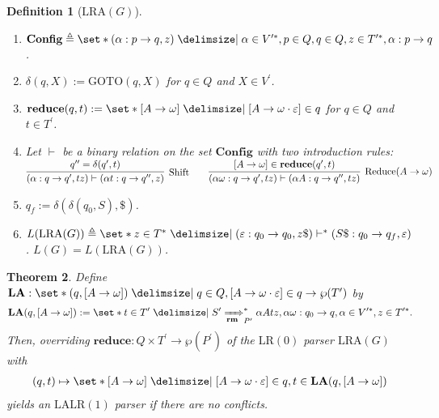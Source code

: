 \documentclass[12pt]{article}
\newtheorem{theorem}{Theorem}
\newtheorem{definition}[theorem]{Definition}
\newcommand{\powerset}
{ \wp }
\begin{document}
\begin{definition}[$\mathrm{LRA}(G)$]
\begin{enumerate}
\item[$\mathrm{(xi)}$] $\mathbf{Config} \triangleq \set*{ ( \alpha : p \to q , z ) \mid \alpha \in V^{\prime \ast}, p \in Q , q \in Q , z \in T^{\prime \ast} , \alpha : p \to q } $.
\item[$\mathrm{(xii)}$] $\delta ( q , X ) := \mathrm{GOTO} ( q , X )$ for $q \in Q$ and $X \in V^\prime$.
\item[$\mathrm{(xiii)}$] $\mathbf{reduce} ( q , t ) := \set*{ [ A \to \omega ] \mid [ A \to \omega \cdot \varepsilon ] \in q }$ for $q \in Q$ and $t \in T^\prime$.
\item[$\mathrm{(xiv)}$] Let $\vdash$ be a binary relation on the set $\mathbf{Config}$ with two introduction rules: \newline $\begin{matrix} \infer[\mathrm{Shift}]{ ( \alpha : q \to q^\prime , t z ) \vdash ( \alpha t : q \to q^{\prime \prime} , z ) }{ q^{\prime \prime} = \delta ( q^\prime , t ) } & & \infer[\mathrm{Reduce} ( A \to \omega )]{ ( \alpha \omega : q \to q^\prime , t z ) \vdash ( \alpha A : q \to q^{\prime \prime} , t z ) }{ [ A \to \omega ] \in \mathbf{reduce} ( q^\prime , t ) } \end{matrix}$
\item[$\mathrm{(xv)}$] $q_f := \delta ( \delta ( q_0 , S ) , \$ )$.
\item[$\mathrm{(xvi)}$] $L ( \mathrm{LRA} ( G ) ) \triangleq \set*{ z \in { T }^\ast \mid ( \varepsilon : q_0 \to q_0 , z \$ ) \vdash^\ast ( S \$ : q_0 \to q_f , \varepsilon ) }$. $L ( G ) = L ( \mathrm{LRA} ( G ) )$.
\end{enumerate}
\end{definition}

\begin{theorem}
Define $\mathbf{LA} : \set*{ ( q , [ A \to \omega ] ) \mid q \in Q , [ A \to \omega \cdot \varepsilon ] \in q } \to \powerset ( T^\prime )$ by
\begin{align}
\mathbf{LA} ( q , [ A \to \omega ] ) := \set*{ t \in T^\prime \mid S^\prime \xRightarrow[\mathbf{rm}]{}_{P^\prime}^\ast \alpha A t z , \alpha \omega : q_0 \to q , \alpha \in V^{\prime \ast}, z \in T^{\prime \ast} } .
\end{align}
Then, overriding $\mathbf{reduce} : Q \times T^\prime \to \powerset ( P^\prime )$ of the $\mathrm{LR(0)}$ parser $\mathrm{LRA} ( G )$ with
\begin{align*}
( q , t ) \mapsto \set*{ [ A \to \omega ] \mid [ A \to \omega \cdot \varepsilon ] \in q , t \in \mathbf{LA} ( q , [ A \to \omega ] ) }
\end{align*}
yields an $\mathrm{LALR(1)}$ parser if there are no conflicts.
\end{theorem}
\end{document}
